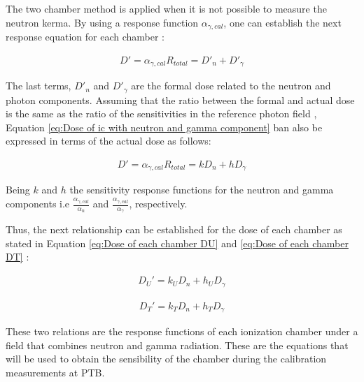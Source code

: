 The two chamber method is applied when it is not possible to measure the neutron kerma. By using a response function $\alpha_{\gamma,cal}$, one can establish the next response equation for each chamber \cite{RadiationOncologyInPhysicsHandbook}: 

\begin{align}
\label{eq:Dose of ic with neutron and gamma component}
    {D' = \alpha_{\gamma,cal} R_{total} = D'_{n} + D'_{\gamma}} 
\end{align}

The last terms, $D'_{n}$ and $ D'_{\gamma}$ are the formal dose related to the neutron and photon components. Assuming that the ratio between the formal and actual dose is the same as the ratio of the sensitivities in the reference photon field \cite{PhDThesisofLucasSommer}, Equation \ref{eq:Dose of ic with neutron and gamma component} ban also be expressed in terms of the actual dose as follows:

\begin{align}
\label{eq:Dose of ic with neutron and gamma component in terms of actual dose}
    {D' = \alpha_{\gamma,cal} R_{total} = kD_{n} + hD_{\gamma}} 
\end{align}

Being $k$ and $h$ the sensitivity response functions for the neutron and gamma components i.e  $\frac{\alpha_{\gamma,cal}}{\alpha_n}$ and $\frac{\alpha_{\gamma,cal}}{\alpha_\gamma}$, respectively. 

Thus, the next relationship can be established for the dose of each chamber as stated in Equation \ref{eq:Dose of each chamber DU} and \ref{eq:Dose of each chamber DT} \cite{PhDThesisofLucasSommer}:

\begin{align}
\label{eq:Dose of each chamber DU}
    {D_U' = k_U D_n + h_U D_\gamma}
\end{align}

\begin{align}
\label{eq:Dose of each chamber DT}
    {D_T' = k_T D_n + h_T D_\gamma}
\end{align}

These two relations are the response functions  of each ionization chamber under a field that combines neutron and gamma radiation. These are the equations that will be used to obtain the sensibility of the chamber during the calibration measurements at PTB.



